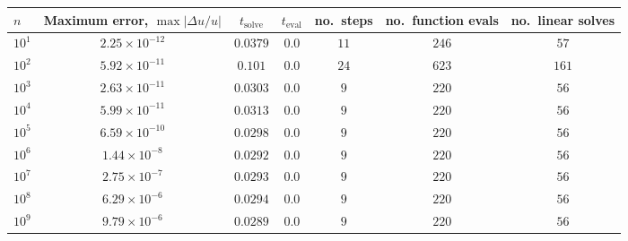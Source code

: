 \begin{tabular}{ l c c c c c c }
\hline \hline
    $n$  &  Maximum error, $\max|\Delta u/u|$  &  $t_{\mathrm{solve}}$  &  $t_{\mathrm{eval}}$  &  no.\ steps  &  no.\ function evals  &  no.\ linear solves  \\ \hline
$10^1$  &  $2.25 \times 10^{-12}$  &  $0.0379$  &  $0.0$  &  $11$  &  $246$  &  $57$ \\ 
$10^2$  &  $5.92 \times 10^{-11}$  &  $0.101$  &  $0.0$  &  $24$  &  $623$  &  $161$ \\ 
$10^3$  &  $2.63 \times 10^{-11}$  &  $0.0303$  &  $0.0$  &  $9$  &  $220$  &  $56$ \\ 
$10^4$  &  $5.99 \times 10^{-11}$  &  $0.0313$  &  $0.0$  &  $9$  &  $220$  &  $56$ \\ 
$10^5$  &  $6.59 \times 10^{-10}$  &  $0.0298$  &  $0.0$  &  $9$  &  $220$  &  $56$ \\ 
$10^6$  &  $1.44 \times 10^{-8}$  &  $0.0292$  &  $0.0$  &  $9$  &  $220$  &  $56$ \\ 
$10^7$  &  $2.75 \times 10^{-7}$  &  $0.0293$  &  $0.0$  &  $9$  &  $220$  &  $56$ \\ 
$10^8$  &  $6.29 \times 10^{-6}$  &  $0.0294$  &  $0.0$  &  $9$  &  $220$  &  $56$ \\ 
$10^9$  &  $9.79 \times 10^{-6}$  &  $0.0289$  &  $0.0$  &  $9$  &  $220$  &  $56$ \\ 

\end{tabular}
